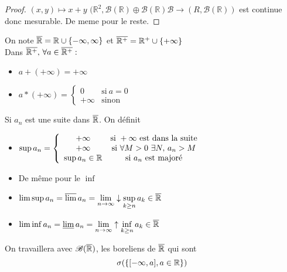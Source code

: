 \begin{proof}
	$(x,y) \mapsto x + y$
	$(\mathbb{R}^2, \mathscr{B}(\mathbb{R}) \oplus \mathscr{B}(\mathbb{R})  \mathscr{B} \rightarrow (R,   \mathscr{B}(\mathbb{R})) $
	est continue donc mesurable. De meme pour le reste.
\end{proof}


\begin{definition}
	On note $\overline{\mathbb{R}} = \mathbb{R} \cup \{ -\infty, \infty \}$ et $\overline{\mathbb{R^+}} = \mathbb{R}^+ \cup \{  +\infty \}$\\
	Dans $\overline{\mathbb{R^+}} , \, \forall a \in \overline{\mathbb{R^+}}: $\\
	\begin{itemize}
		\item $a + (+\infty) = +\infty$
		\item
		      $a * (+\infty) = \left\{ \begin{array}{cc}
                      0       & \text{si} \  a = 0 \\
                      +\infty & \text{sinon}
			      \end{array}\right.$
	\end{itemize}
\end{definition}

\begin{definition}
	Si $a_n$ est une suite dans $\overline{\mathbb{R}}$. On définit
	\begin{itemize}
		\item $\sup a_n =
			      \left\{ \begin{array}{cc}
				      +\infty         & \text{si} \ +\infty \ \text{est dans la suite}   \\
				      +\infty         & \text{si} \ \forall M > 0 \ \exists N,\, a_n > M \\
				      \sup a_n \in \R & \text{si} \ a_n\  \text{est majoré}
			      \end{array}\right.$

		\item De même pour le $\inf$
		\item $\limsup a_n = \varlimsup a_n = \lim\limits_{n \to \infty}\downarrow \sup\limits_{k \geq n } a_k \in \overline{\mathbb{R}}$
		\item $\liminf a_n = \varliminf a_n = \lim\limits_{n \to \infty}\uparrow \inf\limits_{k \geq n } a_k \in \overline{\mathbb{R}}$
	\end{itemize}
\end{definition}


\begin{remarque}
	On travaillera avec $\mathscr{B}(\overline{\mathbb{R}})$, les boreliens de $\overline{\mathbb{R}}$ qui sont
	$$\sigma (\left\{[-\infty, a], a \in \mathbb{R}\right\})$$
\end{remarque}



